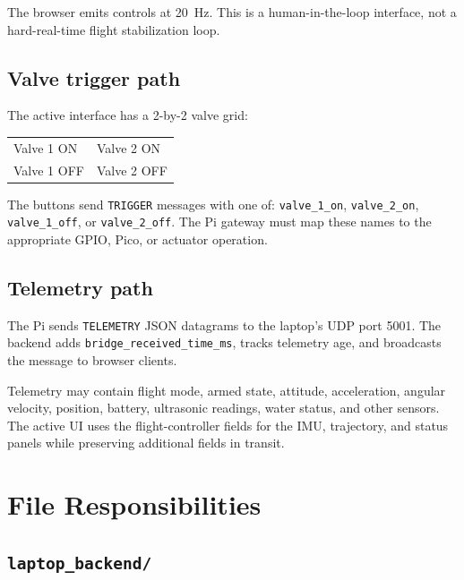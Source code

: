 \documentclass[11pt]{article}
\begin{document}
The browser emits controls at 20~Hz. This is a human-in-the-loop interface,
not a hard-real-time flight stabilization loop.

\subsection{Valve trigger path}

The active interface has a 2-by-2 valve grid:

\begin{center}
\begin{tabular}{ll}
\toprule
Valve 1 ON & Valve 2 ON\\
Valve 1 OFF & Valve 2 OFF\\
\bottomrule
\end{tabular}
\end{center}

The buttons send \texttt{TRIGGER} messages with one of:
\texttt{valve\_1\_on}, \texttt{valve\_2\_on},
\texttt{valve\_1\_off}, or \texttt{valve\_2\_off}. The Pi gateway must map
these names to the appropriate GPIO, Pico, or actuator operation.

\subsection{Telemetry path}

The Pi sends \texttt{TELEMETRY} JSON datagrams to the laptop's UDP port 5001.
The backend adds \texttt{bridge\_received\_time\_ms}, tracks telemetry age,
and broadcasts the message to browser clients.

Telemetry may contain flight mode, armed state, attitude, acceleration,
angular velocity, position, battery, ultrasonic readings, water status, and
other sensors. The active UI uses the flight-controller fields for the IMU,
trajectory, and status panels while preserving additional fields in transit.

\section{File Responsibilities}

\subsection{\texttt{laptop\_backend/}}
\end{document}

